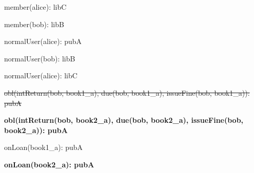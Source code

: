 \documentclass{article}
\begin{document}
{\begin{minipage}{\tableWidth}
\begin{description}[align=left,leftmargin=1em,noitemsep,labelsep=\parindent]
\item{{member(\allowbreak{}alice): libC}}
\item{{member(\allowbreak{}bob): libB}}
\item{{normalUser(\allowbreak{}alice): pubA}}
\item{{normalUser(\allowbreak{}bob): libB}}
\item{{normalUser(\allowbreak{}alice): libC}}
\item{\sout{obl(\allowbreak{}intReturn(\allowbreak{}bob, book1\_a), due(\allowbreak{}bob, book1\_a), issueFine(\allowbreak{}bob, book1\_a)): pubA}}
\item\textbf{{obl(\allowbreak{}intReturn(\allowbreak{}bob, book2\_a), due(\allowbreak{}bob, book2\_a), issueFine(\allowbreak{}bob, book2\_a)): pubA}}
\item{{onLoan(\allowbreak{}book1\_a): pubA}}
\item\textbf{{onLoan(\allowbreak{}book2\_a): pubA}}
\end{description}\end{minipage}}
\end{document}
